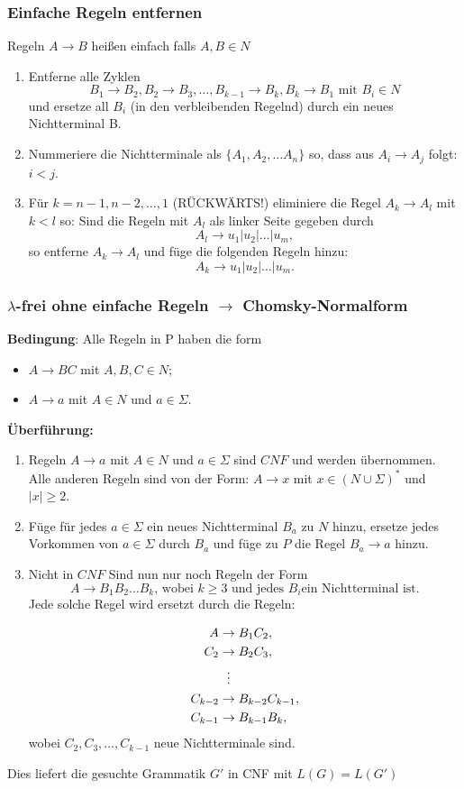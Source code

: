 \documentclass[9pt, a4paper]{article}
\begin{document}
\subsubsection{Einfache Regeln entfernen}
Regeln $A \to B$ heißen einfach falls $A, B \in N$
\begin{enumerate}
	\item Entferne alle Zyklen
	$$B_1 \to B_2, B_2\to B_3, \dots , B_{k-1} \to B_k, B_k \to B_1 \text{ mit } B_i \in N$$
	und ersetze all $B_i$ (in den verbleibenden Regelnd) durch ein neues Nichtterminal B.
	\item Nummeriere die Nichtterminale als $\{A_1, A_2, \dots A_n\}$ so, dass aus $A_i \to A_j$ folgt: $i < j$.
	\item Für $k = n - 1, n - 2, \dots , 1$ (RÜCKWÄRTS!) eliminiere die Regel $A_k \to A_l$ mit $k < l$ so: Sind die Regeln mit $A_l$ als linker Seite gegeben durch
	$$A_l \to u_1 | u_2 | \dots | u_m,$$
	so entferne $A_k \to A_l$ und füge die folgenden Regeln hinzu:
	$$A_k \to u_1 | u_2 | \dots | u_m.$$
\end{enumerate}
\subsubsection{$\lambda$-frei ohne einfache Regeln $\to$ Chomsky-Normalform}
\textbf{Bedingung}: Alle Regeln in P haben die form
\begin{itemize}
	\item $A \to BC$ mit $A, B, C \in N$;
	\item $A \to a$ mit $A \in N$ und $a \in \Sigma$.
\end{itemize}
\textbf{Überführung:}
\begin{enumerate}
	\item Regeln $A \to a$ mit $A \in N$ und $a \in \Sigma$ sind $CNF$ und werden übernommen. Alle anderen Regeln sind von der Form: $A \to x$ mit $x \in (N \cup \Sigma)^*$ und $|x| \geq 2$.
	\item Füge für jedes $a \in \Sigma$ ein neues Nichtterminal $B_a$ zu $N$ hinzu, ersetze jedes Vorkommen von $a \in \Sigma$ durch $B_a$ und füge zu $P$ die Regel $B_a \to a$ hinzu.
	\item Nicht in $CNF$ Sind nun nur noch Regeln der Form
	$$A \to B_1B_2\dots B_k\text{, wobei } k \geq 3 \text{ und jedes } B_i \text{ein Nichtterminal ist.}$$
	Jede solche Regel wird ersetzt durch die Regeln:
	
	\begin{align*}
	A &\to B_1 C_2,\\
	C_2 &\to B_2 C_3,\\
    &\vdotswithin{\to}\\
	C_{k-2} &\to B_{k-2}C_{k-1},\\
	C_{k-1} &\to B_{k-1}B_k,
	\end{align*}
	wobei $C_2, C_3, \dots , C_{k-1}$ neue Nichtterminale sind.
\end{enumerate}
Dies liefert die gesuchte Grammatik $G'$ in CNF mit $L(G) = L(G')$
\end{document}

